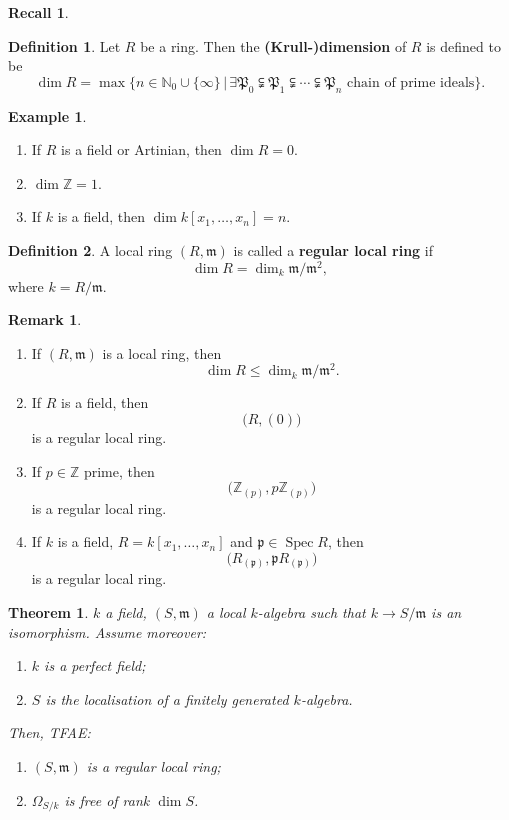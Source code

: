 \documentclass[12pt]{article}
\DeclareMathOperator{\Spec}{Spec}
\newtheorem*{theorem}{Theorem}
\theoremstyle{definition}
\newtheorem*{definition}{Definition}
\newtheorem*{remark}{Remark}
\newtheorem*{recall}{Recall}
\newtheorem*{example}{Example}
\begin{document}
\begin{recall}
\begin{definition}
Let $R$ be a ring. Then the \textbf{(Krull-)dimension} of $R$ is defined to be
\[\dim R=\max\{n\in\mathbb N_0\cup\{\infty\}\,|\,\exists\mathfrak P_0\subsetneqq\mathfrak P_1\subsetneqq\cdots\subsetneqq\mathfrak P_n\text{ chain of prime ideals}\}.\]
\end{definition}

\begin{example}
\begin{enumerate}[label=\arabic*)]
\item If $R$ is a field or Artinian, then $\dim R=0$.

\item $\dim\mathbb Z=1$.

\item If $k$ is a field, then $\dim k[x_1,\ldots,x_n]=n$.
\end{enumerate}
\end{example}
\end{recall}

\begin{definition}
A local ring $(R,\mathfrak m)$ is called a \textbf{regular local ring} if
\[\dim R=\dim_k\mathfrak m/\mathfrak m^2,\]
where $k=R/\mathfrak m$.
\end{definition}

\begin{remark}
\begin{enumerate}[label=\arabic*)]
\item If $(R,\mathfrak m)$ is a local ring, then
\[\dim R\leq\dim_k\mathfrak m/\mathfrak m^2.\]

\item If $R$ is a field, then
\[\big(R,(0)\big)\]
is a regular local ring.

\item If $p\in\mathbb Z$ prime, then
\[\big(\mathbb Z_{(p)},p\mathbb Z_{(p)}\big)\]
is a regular local ring.

\item If $k$ is a field, $R=k[x_1,\ldots,x_n]$ and $\mathfrak p\in\Spec R$, then
\[\big(R_{(\mathfrak p)},\mathfrak pR_{(\mathfrak p)}\big)\]
is a regular local ring.
\end{enumerate}
\end{remark}

\begin{theorem}
$k$ a field, $(S,\mathfrak m)$ a local $k$-algebra such that $k\rightarrow S/\mathfrak m$ is an isomorphism. Assume moreover:
\begin{enumerate}[label=\arabic*)]
\item $k$ is a perfect field;
\item $S$ is the localisation of a finitely generated $k$-algebra.
\end{enumerate}
Then, TFAE:
\begin{enumerate}[label=\arabic*)]
\item\label{aequiv_regular} $(S,\mathfrak m)$ is a regular local ring;
\item\label{aequiv_free} $\Omega_{S/k}$ is free of rank $\dim S$.
\end{enumerate}
\end{theorem}
\end{document}
